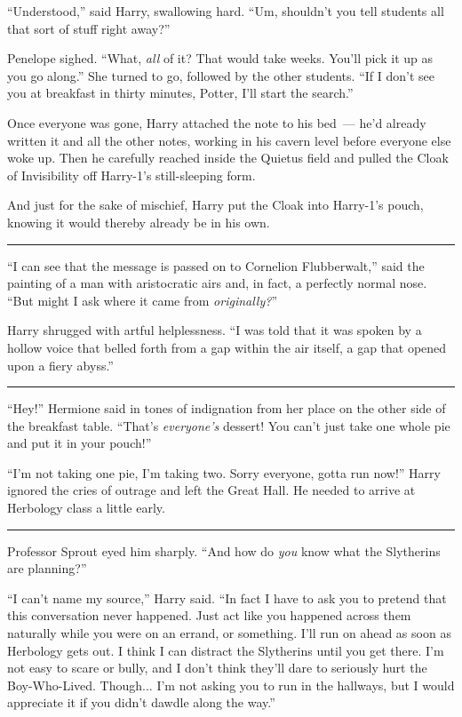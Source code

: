 ``Understood,'' said Harry, swallowing hard. ``Um, shouldn't you tell students all that sort of stuff right away?''

Penelope sighed. ``What, \emph{all} of it? That would take weeks. You'll pick it up as you go along.'' She turned to go, followed by the other students. ``If I don't see you at breakfast in thirty minutes, Potter, I'll start the search.''

Once everyone was gone, Harry attached the note to his bed~--- he'd already written it and all the other notes, working in his cavern level before everyone else woke up. Then he carefully reached inside the Quietus field and pulled the Cloak of Invisibility off Harry-1's still-sleeping form.

And just for the sake of mischief, Harry put the Cloak into Harry-1's pouch, knowing it would thereby already be in his own.

\begin{center}\rule{3in}{0.4pt}\end{center}

``I can see that the message is passed on to Cornelion Flubberwalt,'' said the painting of a man with aristocratic airs and, in fact, a perfectly normal nose. ``But might I ask where it came from \emph{originally?}''

Harry shrugged with artful helplessness. ``I was told that it was spoken by a hollow voice that belled forth from a gap within the air itself, a gap that opened upon a fiery abyss.''

\begin{center}\rule{3in}{0.4pt}\end{center}

``Hey!'' Hermione said in tones of indignation from her place on the other side of the breakfast table. ``That's \emph{everyone's} dessert! You can't just take one whole pie and put it in your pouch!''

``I'm not taking one pie, I'm taking two. Sorry everyone, gotta run now!'' Harry ignored the cries of outrage and left the Great Hall. He needed to arrive at Herbology class a little early.

\begin{center}\rule{3in}{0.4pt}\end{center}

Professor Sprout eyed him sharply. ``And how do \emph{you} know what the Slytherins are planning?''

``I can't name my source,'' Harry said. ``In fact I have to ask you to pretend that this conversation never happened. Just act like you happened across them naturally while you were on an errand, or something. I'll run on ahead as soon as Herbology gets out. I think I can distract the Slytherins until you get there. I'm not easy to scare or bully, and I don't think they'll dare to seriously hurt the Boy-Who-Lived. Though... I'm not asking you to run in the hallways, but I would appreciate it if you didn't dawdle along the way.''

